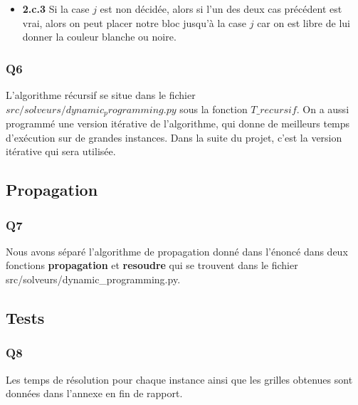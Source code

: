 \documentclass[a4paper]{memoir}
\begin{document}
\begin{itemize}
\begin{itemize}
\begin{itemize}
\begin{itemize}
                \item \textbf{2.c.3} Si la case $j$ est non décidée, alors si l'un des deux cas précédent est vrai, alors on peut placer notre bloc jusqu'à la case $j$ car on est libre de lui donner la couleur blanche ou noire.
            \end{itemize}
        \end{itemize}
    \end{itemize}
\end{itemize}	
	
	\subsubsection{Q6}
	L'algorithme récursif se situe dans le fichier $src/solveurs/dynamic_programming.py$ sous la fonction $T\_recursif$. On a aussi programmé une version itérative de l'algorithme, qui donne de meilleurs temps d'exécution sur de grandes instances. Dans la suite du projet, c'est la version itérative qui sera utilisée.

	\subsection{Propagation}
	\subsubsection{Q7}
	Nous avons séparé l'algorithme de propagation donné dans l'énoncé dans deux fonctions \textbf{propagation} et \textbf{resoudre} qui se trouvent dans le fichier src/solveurs/dynamic_programming.py.

	\subsection{Tests}
	\subsubsection{Q8}
	Les temps de résolution pour chaque instance ainsi que les grilles obtenues sont données dans l'annexe en fin de rapport.
	
\end{document}
